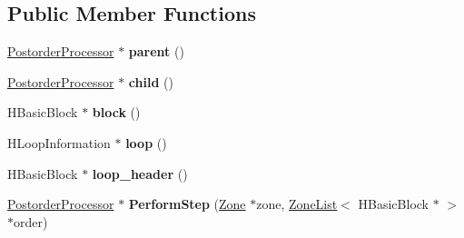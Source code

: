 \subsection*{Public Member Functions}
\begin{DoxyCompactItemize}
\item 
\hypertarget{classv8_1_1internal_1_1_postorder_processor_a9dd8ea5cd5d41e886c635f05535d046d}{}\hyperlink{classv8_1_1internal_1_1_postorder_processor}{Postorder\+Processor} $\ast$ {\bfseries parent} ()\label{classv8_1_1internal_1_1_postorder_processor_a9dd8ea5cd5d41e886c635f05535d046d}

\item 
\hypertarget{classv8_1_1internal_1_1_postorder_processor_ad43b69fbb66c32b6815b889305bb1a52}{}\hyperlink{classv8_1_1internal_1_1_postorder_processor}{Postorder\+Processor} $\ast$ {\bfseries child} ()\label{classv8_1_1internal_1_1_postorder_processor_ad43b69fbb66c32b6815b889305bb1a52}

\item 
\hypertarget{classv8_1_1internal_1_1_postorder_processor_a4ff4376a050013db2c4245de2647c80d}{}H\+Basic\+Block $\ast$ {\bfseries block} ()\label{classv8_1_1internal_1_1_postorder_processor_a4ff4376a050013db2c4245de2647c80d}

\item 
\hypertarget{classv8_1_1internal_1_1_postorder_processor_a0b58299a391ea21e89a77d4c130a2f76}{}H\+Loop\+Information $\ast$ {\bfseries loop} ()\label{classv8_1_1internal_1_1_postorder_processor_a0b58299a391ea21e89a77d4c130a2f76}

\item 
\hypertarget{classv8_1_1internal_1_1_postorder_processor_ac5de7ee5b4269a882cc59f0a98b55802}{}H\+Basic\+Block $\ast$ {\bfseries loop\+\_\+header} ()\label{classv8_1_1internal_1_1_postorder_processor_ac5de7ee5b4269a882cc59f0a98b55802}

\item 
\hypertarget{classv8_1_1internal_1_1_postorder_processor_a8746152c2882edabc129fddf14deccce}{}\hyperlink{classv8_1_1internal_1_1_postorder_processor}{Postorder\+Processor} $\ast$ {\bfseries Perform\+Step} (\hyperlink{classv8_1_1internal_1_1_zone}{Zone} $\ast$zone, \hyperlink{classv8_1_1internal_1_1_zone_list}{Zone\+List}$<$ H\+Basic\+Block $\ast$ $>$ $\ast$order)\label{classv8_1_1internal_1_1_postorder_processor_a8746152c2882edabc129fddf14deccce}

\end{DoxyCompactItemize}

